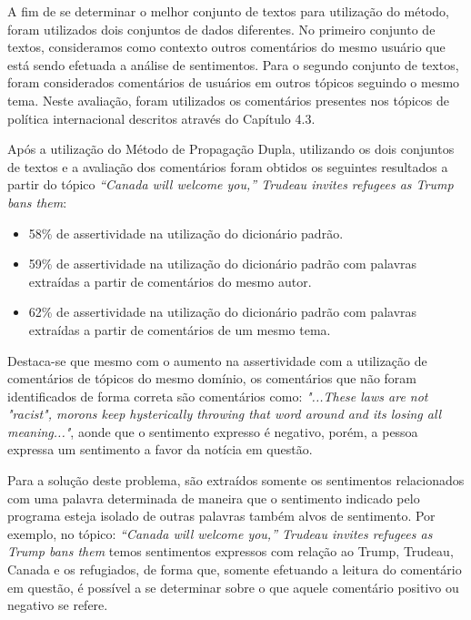 A fim de se determinar o
melhor conjunto de textos para utilização do método, foram utilizados dois
conjuntos de dados diferentes. No primeiro conjunto de textos, consideramos como
contexto outros comentários do mesmo usuário que está sendo efetuada a análise
de sentimentos. Para o segundo conjunto de textos, foram considerados
comentários de usuários em outros tópicos seguindo o mesmo tema. Neste
avaliação, foram utilizados os comentários presentes nos tópicos de política
internacional descritos através do Capítulo 4.3.
 
Após a utilização do Método de Propagação Dupla, utilizando os dois conjuntos
de textos e a avaliação dos comentários foram
obtidos os seguintes resultados a partir do tópico \textit{``Canada will welcome
you,” Trudeau invites refugees as Trump bans them}:
\begin{itemize}
  \item 58\% de assertividade na utilização do dicionário padrão.
  \item 59\% de assertividade na utilização do dicionário padrão com palavras
  extraídas a partir de comentários do mesmo autor.
  \item 62\% de assertividade na utilização do dicionário padrão com palavras
  extraídas a partir de comentários de um mesmo tema.
\end{itemize}
 
Destaca-se que mesmo com o aumento na assertividade com a utilização de
comentários de tópicos do mesmo domínio, os comentários que não foram
identificados de forma correta são comentários como: \textit{"...These
laws are not "racist", morons keep hysterically throwing that word around and
its losing all meaning..."}, aonde que o sentimento expresso é negativo, porém,
a pessoa expressa um sentimento a favor da notícia em questão. 

Para a solução deste problema, são extraídos somente os sentimentos relacionados
com uma palavra determinada de maneira que o sentimento indicado pelo programa
esteja isolado de outras palavras também alvos de sentimento. Por exemplo, no
tópico: \textit{``Canada will welcome
you,” Trudeau invites refugees as Trump bans them} temos sentimentos expressos
com relação ao Trump, Trudeau, Canada e os refugiados, de forma que, somente
efetuando a leitura do comentário em questão, é possível a se determinar sobre o
que aquele comentário positivo ou negativo se refere. 

